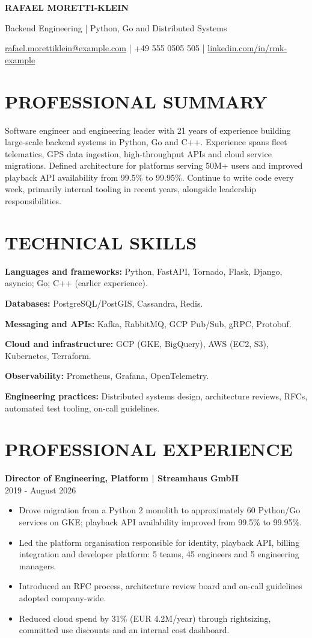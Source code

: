 \documentclass[11pt,a4paper]{article}
\newcommand{\cvsection}[1]{\section*{#1}}
\newcommand{\cvrole}[2]{\noindent\textbf{#1}\\#2\par}
\begin{document}
{\LARGE\bfseries\color{primarycolor} RAFAEL MORETTI-KLEIN}\par
{\large\color{accentcolor} Backend Engineering | Python, Go and Distributed Systems}\par
{\small \href{mailto:rafael.morettiklein@example.com}{rafael.morettiklein@example.com} | +49 555 0505 505 | \href{https://linkedin.com/in/rmk-example}{linkedin.com/in/rmk-example}}\par

\cvsection{PROFESSIONAL SUMMARY}
Software engineer and engineering leader with 21 years of experience building large-scale backend systems in Python, Go and C++. Experience spans fleet telematics, GPS data ingestion, high-throughput APIs and cloud service migrations. Defined architecture for platforms serving 50M+ users and improved playback API availability from 99.5\% to 99.95\%. Continue to write code every week, primarily internal tooling in recent years, alongside leadership responsibilities.

\cvsection{TECHNICAL SKILLS}
\textbf{Languages and frameworks:} Python, FastAPI, Tornado, Flask, Django, asyncio; Go; C++ (earlier experience).\par
\textbf{Databases:} PostgreSQL/PostGIS, Cassandra, Redis.\par
\textbf{Messaging and APIs:} Kafka, RabbitMQ, GCP Pub/Sub, gRPC, Protobuf.\par
\textbf{Cloud and infrastructure:} GCP (GKE, BigQuery), AWS (EC2, S3), Kubernetes, Terraform.\par
\textbf{Observability:} Prometheus, Grafana, OpenTelemetry.\par
\textbf{Engineering practices:} Distributed systems design, architecture reviews, RFCs, automated test tooling, on-call guidelines.

\cvsection{PROFESSIONAL EXPERIENCE}
\cvrole{Director of Engineering, Platform | Streamhaus GmbH}{2019 - August 2026}
\begin{itemize}
\item Drove migration from a Python 2 monolith to approximately 60 Python/Go services on GKE; playback API availability improved from 99.5\% to 99.95\%.
\item Led the platform organisation responsible for identity, playback API, billing integration and developer platform: 5 teams, 45 engineers and 5 engineering managers.
\item Introduced an RFC process, architecture review board and on-call guidelines adopted company-wide.
\item Reduced cloud spend by 31\% (EUR 4.2M/year) through rightsizing, committed use discounts and an internal cost dashboard.
\end{itemize}
\end{document}
